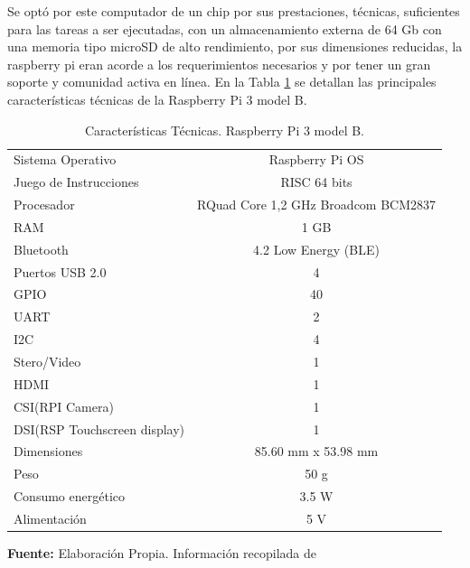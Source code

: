 \begin{itemize}
Se opt\'o por este computador de un chip por sus prestaciones,  t\'ecnicas, suficientes para las tareas a ser ejecutadas, con un almacenamiento externa de 64 Gb con una memoria tipo microSD de alto rendimiento, por sus dimensiones reducidas, la raspberry pi eran acorde a los requerimientos necesarios y por tener un gran soporte y comunidad activa en l\'inea.
En la Tabla \ref{tab:carac_rasp} se detallan las principales características técnicas de la Raspberry Pi 3 model B.
 \begin{table}[t]
      \protect\caption[Características Técnicas. Raspberry Pi 3 model B]{Características Técnicas. Raspberry Pi 3 model B.  \label{tab:carac_rasp}}
     \centering
     \begin{tabular}{l c}
        \toprule
           Sistema Operativo & Raspberry Pi OS\\
          Juego de Instrucciones & RISC 64 bits\\
          Procesador & RQuad Core 1,2 GHz Broadcom BCM2837\\
          RAM  & 1 GB\\
          Bluetooth &  4.2 Low Energy (BLE)\\
          Puertos USB 2.0 & 4\\
          GPIO& 40\\
          UART& 2\\
          I2C& 4\\
          Stero/Video & 1\\
          HDMI & 1\\
          CSI(RPI Camera) & 1\\
          DSI(RSP Touchscreen display) & 1\\
          Dimensiones & 85.60 mm x 53.98 mm\\
          Peso & 50 g\\
          Consumo energ\'etico & 3.5 W\\
          Alimentaci\'on & 5 V\\
     \bottomrule   
     \end{tabular}
     \vspace{5mm}
     \newline
     \hfill \textbf{Fuente:} Elaboración Propia. Información recopilada de \cite{rasp}

\end{table}
\end{itemize}
